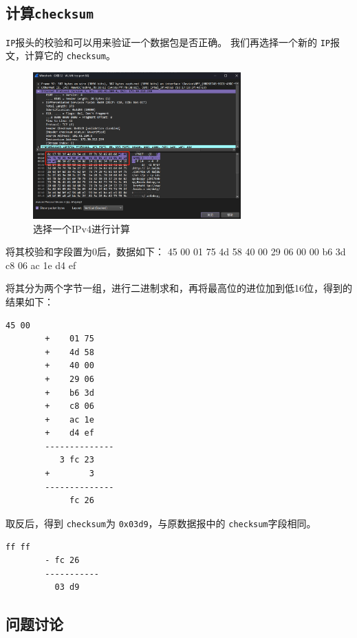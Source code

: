 \documentclass{article}
\begin{document}
	\subsection{计算\texttt{checksum}}
	
	\texttt{IP}报头的校验和可以用来验证一个数据包是否正确。
	我们再选择一个新的 \texttt{IP}报文，计算它的 \texttt{checksum}。
	
	\begin{figure}[H]
		\centering
		\includegraphics[width=8cm]{images/22. 选择一个IPv4进行计算.jpg}
		\caption{选择一个IPv4进行计算}
	\end{figure}
	
	将其校验和字段置为0后，数据如下：
	45 00 01 75 4d 58 40 00 29 06 00 00 b6 3d c8 06 ac 1e d4 ef
	
	将其分为两个字节一组，进行二进制求和，再将最高位的进位加到低16位，得到的结果如下：
	
	\begin{lstlisting}[numbers=none]
		     45 00 
		+    01 75
		+    4d 58 
		+    40 00 
		+    29 06
		+    b6 3d
		+    c8 06
		+    ac 1e
		+    d4 ef
		--------------
		   3 fc 23
		+        3
		--------------
		     fc 26
	\end{lstlisting}
	
	取反后，得到 \texttt{checksum}为 \texttt{0x03d9}，与原数据报中的 \texttt{checksum}字段相同。
	
	\begin{lstlisting}[numbers=none]
		  ff ff
		- fc 26
		-----------
		  03 d9
	\end{lstlisting}
	
	\subsection{问题讨论}
	
\end{document}
